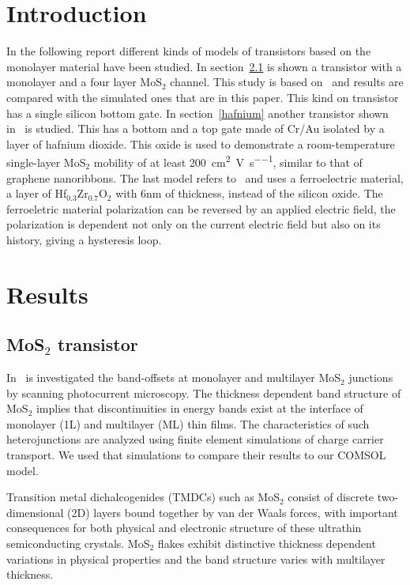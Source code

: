 \documentclass[electronics,article,submit,moreauthors,pdftex]{Definitions/mdpi}
\begin{document}
\section{Introduction}

In the following report different kinds of models of transistors based on the monolayer material have been studied. In section~\ref{mos2} is shown a transistor with a monolayer and a four layer MoS$_2$ channel. This study is based on~\cite{Howell:MonolayerMultiLayer_MoS2} and results are compared with the simulated ones that are in this paper. This kind on transistor has a single silicon bottom gate.
In section~\ref{hafnium} another transistor shown in~\cite{Radisavljevic:Si_MoS2} is studied. This has a bottom and a top gate made of Cr/Au isolated by a layer of hafnium dioxide. This oxide is used to demonstrate a room-temperature single-layer MoS$_2$ mobility of at least \SI{200}{\square \centi \meter \per \volt \per \second}, similar to that of graphene nanoribbons.
The last model refers to~\cite{Dragoman:ferroelectric} and uses a ferroelectric material, a layer of Hf$_0.3$Zr$_0.7$O$_2$ with 6nm of thickness, instead of the silicon oxide. The ferroeletric material polarization can be reversed by an applied electric field, the polarization is dependent not only on the current electric field but also on its history, giving a hysteresis loop.
\section{Results}

\subsection{MoS$_2$ transistor}
\label{mos2}

In~\cite{Howell:MonolayerMultiLayer_MoS2} is investigated the band-offsets at monolayer and multilayer MoS$_2$ junctions by scanning photocurrent microscopy. The thickness dependent band structure of MoS$_2$ implies that discontinuities in energy bands exist at the interface of monolayer (1L) and multilayer (ML) thin films. The characteristics of such heterojunctions are analyzed using finite element simulations of charge carrier transport. We used that simulations to compare their results to our COMSOL model.

Transition metal dichalcogenides (TMDCs) such as MoS$_2$ consist of discrete two-dimensional (2D) layers bound together by van der Waals forces, with important consequences for both physical and electronic structure of these ultrathin semiconducting crystals. MoS$_2$ flakes exhibit distinctive thickness dependent variations in physical properties and the band structure varies with multilayer thickness.
\end{document}
